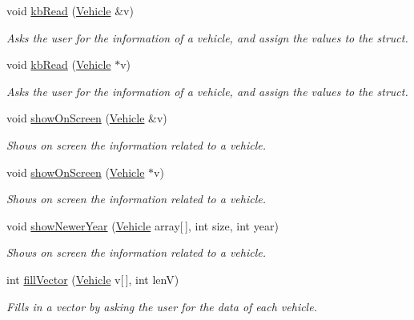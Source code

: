 \begin{DoxyCompactItemize}
\item 
void \hyperlink{namespacevehicles_a977739be053b4c9c7a60c7df70c5a248}{kb\+Read} (\hyperlink{structvehicles_1_1_vehicle}{Vehicle} \&v)
\begin{DoxyCompactList}\small\item\em Asks the user for the information of a vehicle, and assign the values to the struct. \end{DoxyCompactList}\item 
void \hyperlink{namespacevehicles_a2300b1362115526825e6628cd2fc5c2e}{kb\+Read} (\hyperlink{structvehicles_1_1_vehicle}{Vehicle} $\ast$v)
\begin{DoxyCompactList}\small\item\em Asks the user for the information of a vehicle, and assign the values to the struct. \end{DoxyCompactList}\item 
void \hyperlink{namespacevehicles_ad14cfded1968e061af399d493d85c5d0}{show\+On\+Screen} (\hyperlink{structvehicles_1_1_vehicle}{Vehicle} \&v)
\begin{DoxyCompactList}\small\item\em Shows on screen the information related to a vehicle. \end{DoxyCompactList}\item 
void \hyperlink{namespacevehicles_a687a5a510662dc4c11628842c7ec4fb8}{show\+On\+Screen} (\hyperlink{structvehicles_1_1_vehicle}{Vehicle} $\ast$v)
\begin{DoxyCompactList}\small\item\em Shows on screen the information related to a vehicle. \end{DoxyCompactList}\item 
void \hyperlink{namespacevehicles_a0f9a12db6818e42fc81a188e0ef2148d}{show\+Newer\+Year} (\hyperlink{structvehicles_1_1_vehicle}{Vehicle} array\mbox{[}$\,$\mbox{]}, int size, int year)
\begin{DoxyCompactList}\small\item\em Shows on screen the information related to a vehicle. \end{DoxyCompactList}\item 
int \hyperlink{namespacevehicles_af433e175f2fde47d92c70af7661eef36}{fill\+Vector} (\hyperlink{structvehicles_1_1_vehicle}{Vehicle} v\mbox{[}$\,$\mbox{]}, int lenV)
\begin{DoxyCompactList}\small\item\em Fills in a vector by asking the user for the data of each vehicle. \end{DoxyCompactList}\item 

\end{DoxyCompactItemize}
